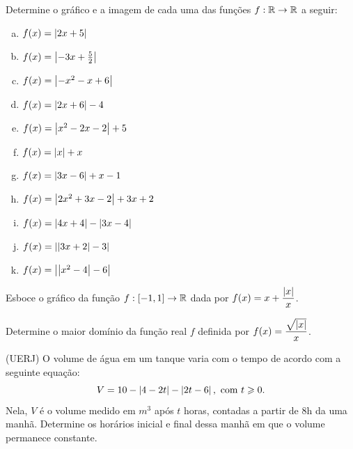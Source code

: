 \begin{secExercicios}
    \begin{exer}
        Determine o gráfico e a imagem de cada uma das funções $f:\mathbb{R}\to\mathbb{R}$ a seguir:
        \begin{enumerate}[a)]
            \item $f(x)=\left|2x+5\right|$
            \item $f(x)=\left|-3x+\frac{5}{2}\right|$
            \item $f(x)=\left|-x^2-x+6\right|$
            \item $f(x)=\left|2x+6\right|-4$
            \item $f(x)=\left|x^2-2x-2\right|+5$
            \item $f(x)=\left|x\right|+x$
            \item $f(x)=\left|3x-6\right|+x-1$
            \item $f(x)=\left|2x^2+3x-2\right|+3x+2$
            \item $f(x)=\left|4x+4\right|-\left|3x-4\right|$
            \item $f(x)=\left|\left|3x+2\right|-3\right|$
            \item $f(x)=\left|\left|x^2-4\right|-6\right|$
        \end{enumerate}
    \end{exer}

    \begin{exer}
        Esboce o gráfico da função $f:[-1,1]\to\mathbb{R}$ dada por $f(x)=x+\dfrac{\left|x\right|}{x}$.
    \end{exer}

    \begin{exer}
        Determine o maior domínio da função real $f$ definida por $f(x)=\dfrac{\sqrt{\left|x\right|}}{x}$.
    \end{exer}

    \begin{exer}
        (UERJ) O volume de água em um tanque varia com o tempo de acordo com a seguinte equação:
        $$
        V= 10-\left|4-2t\right|-\left|2t-6\right|, \text{ com } t\geqslant 0.
        $$
        Nela, $V$ é o volume medido em $m^3$ após $t$ horas, contadas a partir de 8h da uma manhã. Determine os horários inicial e final dessa manhã em que o volume permanece constante.
    \end{exer}
    
\end{secExercicios}